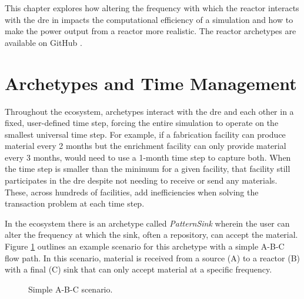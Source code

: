 This chapter explores how altering the frequency with which the \cycamore reactor interacts with the \gls{dre} in \cyclus impacts the computational efficiency of a simulation and how to make the power output from a reactor more realistic. The reactor archetypes are available on GitHub \cite{ryan_near}.

\section{Archetypes and Time Management}
\label{sec:archetypes_and_time_management}

Throughout the \cyclus ecosystem, archetypes interact with the \gls{dre} and
each other in a fixed, user-defined time step, forcing the entire simulation
to operate on the smallest universal time step. For example, if a fabrication
facility can produce material every 2 months but the enrichment facility can
only provide material every 3 months, \cyclus would need to use a 1-month time step to capture both. When the time step is smaller than the minimum for a given
facility, that facility still participates in the \gls{dre} despite not needing to receive or send any materials. These, across hundreds of facilities, add inefficiencies when solving the transaction problem at each time step.

In the \cyclus ecosystem there is an archetype called \textit{PatternSink} wherein the user can alter the frequency at which the sink, often a repository, can accept the material. Figure \ref{fig:a-b-c} outlines an example scenario for this archetype with a simple A-B-C flow path. In this scenario, material is received from a source (A) to a reactor (B) with a final (C) sink that can only accept material at a specific frequency.

\begin{figure}[H]
    \centering
    \caption{Simple A-B-C scenario.}
    \label{fig:a-b-c}
\end{figure}

